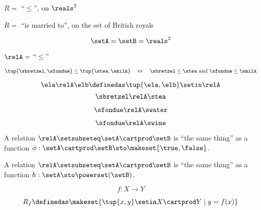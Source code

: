 {\begin{forslides}
        \begin{center}
            $R =$ ``$\leq$'', on $\reals^2 $ \label{eq:slides-11}
        \end{center}

        \begin{center}
            $R =$ ``is married to'', on the set of British royals \label{eq:slides-11a}
        \end{center}

        \begin{equation}
            \setA = \setB = \reals^2 \label{eq:slides-12}
        \end{equation}

        \begin{center}
            $\relA =$ ``$\leq$''  \label{eq:slides-13}
        \end{center}

        \begin{equation}
            \tup{\sbretzel, \sfondue} \leq \tup{\stea, \smilk} \quad \Leftrightarrow \quad \sbretzel \leq \stea \text{ and } \sfondue \leq \smilk \label{eq:slides-14}
        \end{equation}

        \begin{equation}
            \ela \relA \elb \definedas \tup{\ela, \elb} \setin \relA  \label{eq:slides-15}
        \end{equation}
        \begin{equation}
            \sbretzel \relA \stea \label{eq:slides-16}
        \end{equation}

        \begin{equation}
            \sfondue \relA \swater \label{eq:slides-17}
        \end{equation}

        \begin{equation}
            \sfondue \relA \swine \label{eq:slides-18}
        \end{equation}

        A relation $\relA \setsubseteq \setA \cartprod \setB$ is ``the same thing'' as a function $\phi : \setA \cartprod \setB \sto \makeset{\true, \false}$.

        A relation $\relA \setsubseteq \setA \cartprod \setB$ is ``the same thing'' as a function $h : \setA  \sto \powerset (\setB)$.

        \begin{equation}
            f : X \to Y
        \end{equation}

        \begin{equation}
            R_f \definedas \makeset{ \tup{x, y} \setin X \cartprod Y \mid y = f(x) }
        \end{equation}

    \end{forslides}
}

